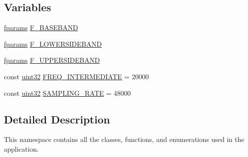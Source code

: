 \subsection*{Variables}
\begin{DoxyCompactItemize}
\item 
\hyperlink{definitions_8hpp_a7615684c2af56be5f302c5b367d71f6b}{fparams} \hyperlink{namespaceradio_a9bd902e9216499953a5906de73dc1796}{F\+\_\+\+B\+A\+S\+E\+B\+A\+N\+D}
\item 
\hyperlink{definitions_8hpp_a7615684c2af56be5f302c5b367d71f6b}{fparams} \hyperlink{namespaceradio_a0ffd57d5a11ff70a1f55dbdc8ebe098d}{F\+\_\+\+L\+O\+W\+E\+R\+S\+I\+D\+E\+B\+A\+N\+D}
\item 
\hyperlink{definitions_8hpp_a7615684c2af56be5f302c5b367d71f6b}{fparams} \hyperlink{namespaceradio_a0ec4548711b6d6ed6867c70b3fc2a413}{F\+\_\+\+U\+P\+P\+E\+R\+S\+I\+D\+E\+B\+A\+N\+D}
\item 
const \hyperlink{definitions_8hpp_a1134b580f8da4de94ca6b1de4d37975e}{uint32} \hyperlink{namespaceradio_aa82ddc6ba206798fd70ffc25665b3cb6}{F\+R\+E\+Q\+\_\+\+I\+N\+T\+E\+R\+M\+E\+D\+I\+A\+T\+E} = 20000
\item 
const \hyperlink{definitions_8hpp_a1134b580f8da4de94ca6b1de4d37975e}{uint32} \hyperlink{namespaceradio_a284213fea4beed2f74bb936927cbe654}{S\+A\+M\+P\+L\+I\+N\+G\+\_\+\+R\+A\+T\+E} = 48000
\end{DoxyCompactItemize}


\subsection{Detailed Description}
This namespace contains all the classes, functions, and enumerations used in the application. 

